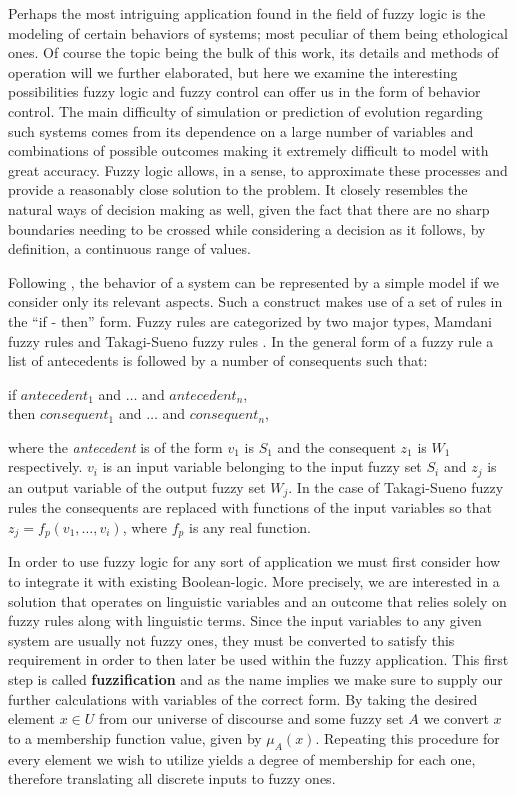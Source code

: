 Perhaps the most intriguing application found in the field of fuzzy logic is the modeling of certain behaviors of systems; most peculiar of them being ethological ones. Of course the topic being the bulk of this work, its details and methods of operation will we further elaborated, but here we examine the interesting possibilities fuzzy logic and fuzzy control can offer us in the form of  behavior control. The main difficulty of simulation or prediction of evolution regarding such systems comes from its dependence on a large number of variables and combinations of possible outcomes making it extremely difficult to model with great accuracy. Fuzzy logic allows, in a sense, to approximate these processes and provide a reasonably close solution to the problem. It closely resembles the natural ways of decision making as well, given the fact that there are no sharp boundaries needing to be crossed while considering a decision as it follows, by definition, a continuous range of values.

Following \cite{sabri2013}, the behavior of a system can be represented by a simple model if we consider only its relevant aspects. Such a construct makes use of a set of rules in the ``if - then'' form. Fuzzy rules are categorized by two major types, Mamdani fuzzy rules and Takagi-Sueno fuzzy rules \cite{takagi1985}. In the general form of a fuzzy rule a list of antecedents is followed by a number of consequents such that:

\begin{center}
	if $antecedent_1$ and $\ldots$ and $antecedent_n$,\\
	then $consequent_1$ and $\ldots$ and $consequent_n$,
\end{center}

\noindent where the \textit{antecedent} is of the form $v_1$ is $S_1$ and the consequent $z_1$ is $W_1$ respectively. $v_i$ is an input variable belonging to the input fuzzy set $S_i$ and $z_j$ is an output variable of the output fuzzy set $W_j$.
In the case of Takagi-Sueno fuzzy rules the consequents are replaced with functions of the input variables so that $z_j = f_p(v_1, \ldots, v_i)$, where $f_p$ is any real function.

In order to use fuzzy logic for any sort of application we must first consider how to integrate it with existing Boolean-logic. More precisely, we are interested in a solution that operates on linguistic variables and an outcome that relies solely on fuzzy rules along with linguistic terms. Since the input variables to any given system are usually not fuzzy ones, they must be converted to satisfy this requirement in order to then later be used within the fuzzy application. This first step is called \textbf{fuzzification} and as the name implies we make sure to supply our further calculations with variables of the correct form. By taking the desired element $x \in U$ from our universe of discourse and some fuzzy set $A$ we convert $x$ to a membership function value, given by $\mu_{A}(x)$. Repeating this procedure for every element we wish to utilize yields a degree of membership for each one, therefore translating all discrete inputs to fuzzy ones.

